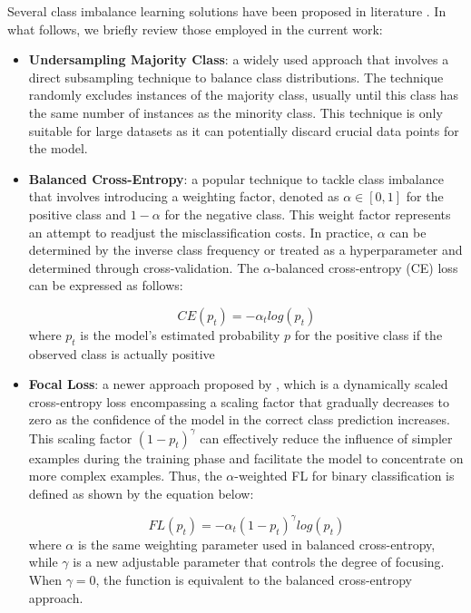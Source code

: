 Several class imbalance learning solutions have been proposed in literature \cite{he2009learning}. In what follows, we briefly review those employed in the current work:
\begin{itemize}
    \item \textbf{Undersampling Majority Class}: a widely used approach that involves a direct subsampling technique to balance class distributions. The technique randomly excludes instances of the majority class, usually until this class has the same number of instances as the minority class. This technique is only suitable for large datasets as it can potentially discard crucial data points for the model.

    \item \textbf{Balanced Cross-Entropy}: a popular technique to tackle class imbalance that involves introducing a weighting factor, denoted as $\alpha \in [0, 1]$ for the positive class and $1 - \alpha$ for the negative class. This weight factor represents an attempt to readjust the misclassification costs. In practice, $\alpha$ can be determined by the inverse class frequency or treated as a hyperparameter and determined through cross-validation. The $\alpha$-balanced cross-entropy (CE) loss can be expressed as follows:

    \begin{equation}
    \label{eq:cross_entropy}
    CE(p_t) = -\alpha_t log(p_t)
    \end{equation}
    where $p_t$ is the model’s estimated probability $p$ for the positive class if the observed class is actually positive

    \item \textbf{Focal Loss}: a newer approach proposed by \citet{lin2017focal}, which is a dynamically scaled cross-entropy loss encompassing a scaling factor that gradually decreases to zero as the confidence of the model in the correct class prediction increases. This scaling factor $(1 - p_t)^\gamma$ can effectively reduce the influence of simpler examples during the training phase and facilitate the model to concentrate on more complex examples. Thus, the $\alpha$-weighted FL for binary classification is defined as shown by the equation below:

    \begin{equation}
    \label{eq:focal_loss}
    FL(p_t) = -\alpha_t(1-p_t)^\gamma log(p_t)
    \end{equation}
    where $\alpha$ is the same weighting parameter used in balanced cross-entropy, while $\gamma$ is a new adjustable parameter that controls the degree of focusing. When $\gamma = 0$, the function is equivalent to the balanced cross-entropy approach.
\end{itemize}





